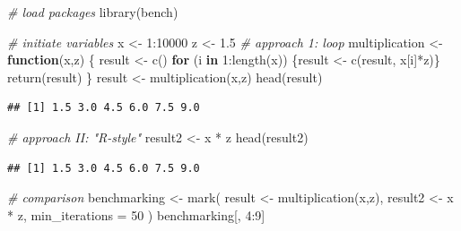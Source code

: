 \documentclass[
  12pt,
]{style/krantz}
\newenvironment{Shaded}{\begin{snugshade}}{\end{snugshade}}
\newcommand{\AttributeTok}[1]{\textcolor[rgb]{0.77,0.63,0.00}{#1}}
\newcommand{\CommentTok}[1]{\textcolor[rgb]{0.56,0.35,0.01}{\textit{#1}}}
\newcommand{\ControlFlowTok}[1]{\textcolor[rgb]{0.13,0.29,0.53}{\textbf{#1}}}
\newcommand{\DecValTok}[1]{\textcolor[rgb]{0.00,0.00,0.81}{#1}}
\newcommand{\FloatTok}[1]{\textcolor[rgb]{0.00,0.00,0.81}{#1}}
\newcommand{\FunctionTok}[1]{\textcolor[rgb]{0.00,0.00,0.00}{#1}}
\newcommand{\NormalTok}[1]{#1}
\newcommand{\OtherTok}[1]{\textcolor[rgb]{0.56,0.35,0.01}{#1}}
\newcommand{\SpecialCharTok}[1]{\textcolor[rgb]{0.00,0.00,0.00}{#1}}
\begin{document}
\begin{Shaded}
\begin{Highlighting}[]
\CommentTok{\# load packages}
\FunctionTok{library}\NormalTok{(bench)}

\CommentTok{\# initiate variables}
\NormalTok{x }\OtherTok{\textless{}{-}} \DecValTok{1}\SpecialCharTok{:}\DecValTok{10000}
\NormalTok{z }\OtherTok{\textless{}{-}} \FloatTok{1.5}
\CommentTok{\# approach 1: loop}
\NormalTok{multiplication }\OtherTok{\textless{}{-}} 
        \ControlFlowTok{function}\NormalTok{(x,z) \{}
\NormalTok{                result }\OtherTok{\textless{}{-}} \FunctionTok{c}\NormalTok{()}
                \ControlFlowTok{for}\NormalTok{ (i }\ControlFlowTok{in} \DecValTok{1}\SpecialCharTok{:}\FunctionTok{length}\NormalTok{(x)) \{result }\OtherTok{\textless{}{-}} \FunctionTok{c}\NormalTok{(result, x[i]}\SpecialCharTok{*}\NormalTok{z)\}}
                \FunctionTok{return}\NormalTok{(result)}
\NormalTok{        \}}
\NormalTok{result }\OtherTok{\textless{}{-}} \FunctionTok{multiplication}\NormalTok{(x,z)}
\FunctionTok{head}\NormalTok{(result)}
\end{Highlighting}
\end{Shaded}

\begin{verbatim}
## [1] 1.5 3.0 4.5 6.0 7.5 9.0
\end{verbatim}

\begin{Shaded}
\begin{Highlighting}[]
\CommentTok{\# approach II: "R{-}style"}
\NormalTok{result2 }\OtherTok{\textless{}{-}}\NormalTok{ x }\SpecialCharTok{*}\NormalTok{ z }
\FunctionTok{head}\NormalTok{(result2)}
\end{Highlighting}
\end{Shaded}

\begin{verbatim}
## [1] 1.5 3.0 4.5 6.0 7.5 9.0
\end{verbatim}

\begin{Shaded}
\begin{Highlighting}[]
\CommentTok{\# comparison}
\NormalTok{benchmarking }\OtherTok{\textless{}{-}} 
        \FunctionTok{mark}\NormalTok{(}
\NormalTok{        result }\OtherTok{\textless{}{-}} \FunctionTok{multiplication}\NormalTok{(x,z),}
\NormalTok{        result2 }\OtherTok{\textless{}{-}}\NormalTok{ x }\SpecialCharTok{*}\NormalTok{ z, }
        \AttributeTok{min\_iterations =} \DecValTok{50} 
\NormalTok{)}
\NormalTok{benchmarking[, }\DecValTok{4}\SpecialCharTok{:}\DecValTok{9}\NormalTok{]}
\end{Highlighting}
\end{Shaded}
\end{document}
